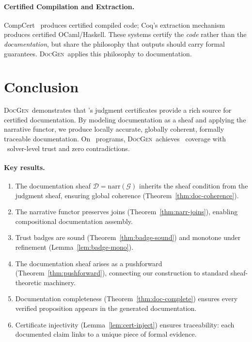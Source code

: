 \documentclass[11pt]{article}
\newcommand{\DocGen}{\textsc{DocGen}}
\newcommand{\DocSheaf}{\mathcal{D}}
\newcommand{\NarrFunc}{\mathrm{narr}}
\begin{document}
\paragraph{Certified Compilation and Extraction.}
CompCert~\cite{Leroy2009} produces certified compiled code;
Coq's extraction mechanism produces certified OCaml/Haskell.
These systems certify the \emph{code} rather than the
\emph{documentation}, but share the philosophy that outputs
should carry formal guarantees.  \DocGen\ applies this
philosophy to documentation.

\section{Conclusion}\label{sec:conclusion}

\DocGen\ demonstrates that \JuGeo's judgment certificates provide a
rich source for certified documentation.  By modeling documentation as
a sheaf and applying the narrative functor, we produce locally accurate,
globally coherent, formally traceable documentation.  On
\compTotalPrograms\ programs, \DocGen\ achieves \compOverallAccuracy\
coverage with \compTrustSolverdischargedPct\ solver-level trust and
zero contradictions.

\paragraph{Key results.}
\begin{enumerate}[noitemsep]
\item The documentation sheaf $\DocSheaf = \NarrFunc(\mathcal{G})$
  inherits the sheaf condition from the judgment sheaf, ensuring
  global coherence (Theorem~\ref{thm:doc-coherence}).
\item The narrative functor preserves joins
  (Theorem~\ref{thm:narr-joins}), enabling compositional
  documentation assembly.
\item Trust badges are sound (Theorem~\ref{thm:badge-sound}) and
  monotone under refinement (Lemma~\ref{lem:badge-mono}).
\item The documentation sheaf arises as a pushforward
  (Theorem~\ref{thm:pushforward}), connecting our construction to
  standard sheaf-theoretic machinery.
\item Documentation completeness
  (Theorem~\ref{thm:doc-complete}) ensures every verified
  proposition appears in the generated documentation.
\item Certificate injectivity (Lemma~\ref{lem:cert-inject})
  ensures traceability: each documented claim links to a unique
  piece of formal evidence.
\end{enumerate}
\end{document}
